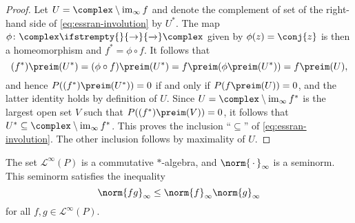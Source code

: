 \documentclass[article, a4paper, 11pt, oneside]{memoir}
\numberwithin{equation}{chapter}
\newcommand{\calL}{\mathcal{L}}
\renewcommand\to[1][]{%
    \ifstrempty{#1}{%
        \rightarrow
    }{%
        \xrightarrow[#1]{}
    }%
}
\begin{document}
\begin{proof}
    Let $U = \complex \setminus \essran f$ and denote the complement of set of the right-hand side of \cref{eq:essran-involution} by $U^*$. The map $\phi \colon \complex \to \complex$ given by $\phi(z) = \conj{z}$ is then a homeomorphism and $f^* = \phi \circ f$. It follows that
    \begin{equation*}
        (f^*)\preim(U^*)
            = (\phi \circ f)\preim(U^*)
            = f\preim(\phi\preim(U^*))
            = f\preim(U),
    \end{equation*}
    and hence $P((f^*)\preim(U^*)) = 0$ if and only if $P(f\preim(U)) = 0$, and the latter identity holds by definition of $U$. Since $U = \complex \setminus \essran f^*$ is the largest open set $V$ such that $P((f^*)\preim(V)) = 0$, it follows that $U^* \subseteq \complex \setminus \essran f^*$. This proves the inclusion \enquote{$\subseteq$} of \cref{eq:essran-involution}. The other inclusion follows by maximality of $U$.
\end{proof}

\begin{lemma}
    The set $\calL^\infty(P)$ is a commutative $*$-algebra, and $\norm{\,\cdot\,}_\infty$ is a seminorm. This seminorm satisfies the inequality
    \begin{equation}
        \label{eq:Linfty-Banach-inequality}
        \norm{fg}_\infty
            \leq \norm{f}_\infty \norm{g}_\infty
    \end{equation}
    for all $f,g \in \calL^\infty(P)$.
\end{lemma}
\end{document}
